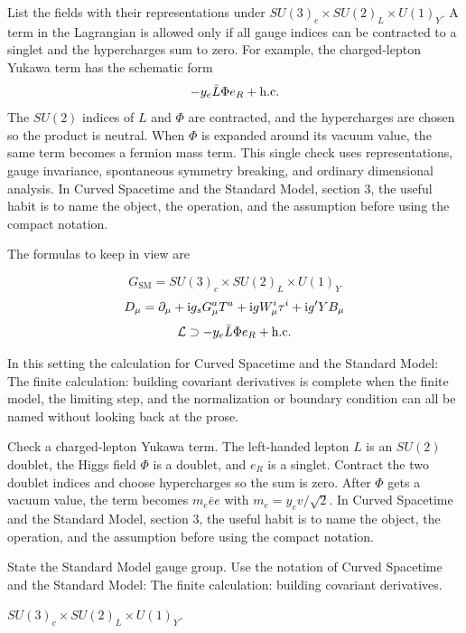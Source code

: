 List the fields with their representations under \(SU(3)_c\times SU(2)_L\times U(1)_Y\).  A term in the Lagrangian is allowed only if all gauge indices can be contracted to a singlet and the hypercharges sum to zero.  For example, the charged-lepton Yukawa term has the schematic form
\[
  -y_e\bar L\Phi e_R+\hbox{h.c.}
\]
The \(SU(2)\) indices of \(L\) and \(\Phi\) are contracted, and the hypercharges are chosen so the product is neutral.  When \(\Phi\) is expanded around its vacuum value, the same term becomes a fermion mass term.  This single check uses representations, gauge invariance, spontaneous symmetry breaking, and ordinary dimensional analysis.  In Curved Spacetime and the Standard Model, section 3, the useful habit is to name the object, the operation, and the assumption before using the compact notation.

The formulas to keep in view are

\[
  G_{\mathrm{SM}}=SU(3)_c\times SU(2)_L\times U(1)_Y
\]
\[
  D_\mu=\partial_\mu+\mathrm i g_sG_\mu^aT^a+\mathrm i gW_\mu^i\tau^i+\mathrm i g'YB_\mu
\]
\[
  \mathcal L\supset -y_e\bar L\Phi e_R+\hbox{h.c.}
\]

In this setting the calculation for Curved Spacetime and the Standard Model: The finite calculation: building covariant derivatives is complete when the finite model, the limiting step, and the normalization or boundary condition can all be named without looking back at the prose.




\begin{example}
Check a charged-lepton Yukawa term.  The left-handed lepton \(L\) is an \(SU(2)\) doublet, the Higgs field \(\Phi\) is a doublet, and \(e_R\) is a singlet.  Contract the two doublet indices and choose hypercharges so the sum is zero.  After \(\Phi\) gets a vacuum value, the term becomes \(m_e\bar e e\) with \(m_e=y_ev/\sqrt2\).  In Curved Spacetime and the Standard Model, section 3, the useful habit is to name the object, the operation, and the assumption before using the compact notation.
\end{example}



\begin{exercise}
State the Standard Model gauge group.  Use the notation of Curved Spacetime and the Standard Model: The finite calculation: building covariant derivatives.
\begin{answer}
\(SU(3)_c\times SU(2)_L\times U(1)_Y\).
\end{answer}
\end{exercise}

